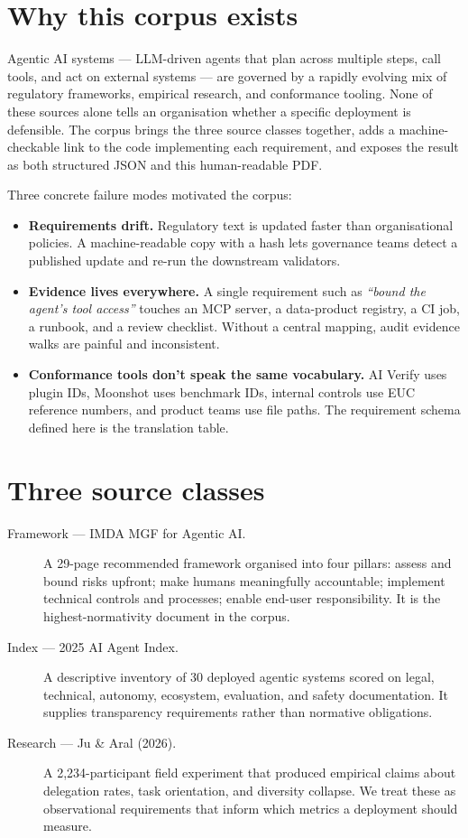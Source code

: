 \documentclass[11pt,a4paper,twoside]{report}
\newcommand{\corpus}{}
\begin{document}
\section{Why this corpus exists}

Agentic AI systems --- LLM-driven agents that plan across multiple steps,
call tools, and act on external systems --- are governed by a rapidly
evolving mix of regulatory frameworks, empirical research, and conformance
tooling. None of these sources alone tells an organisation whether a
specific deployment is defensible. The \corpus{} corpus brings the three
source classes together, adds a machine-checkable link to the code
implementing each requirement, and exposes the result as both structured
JSON and this human-readable PDF.

Three concrete failure modes motivated the corpus:

\begin{itemize}
\item \textbf{Requirements drift.} Regulatory text is updated faster than
organisational policies. A machine-readable copy with a hash lets
governance teams detect a published update and re-run the
downstream validators.
\item \textbf{Evidence lives everywhere.} A single requirement such as
\emph{``bound the agent's tool access''} touches an MCP server, a
data-product registry, a CI job, a runbook, and a review checklist.
Without a central mapping, audit evidence walks are painful and
inconsistent.
\item \textbf{Conformance tools don't speak the same vocabulary.} AI
Verify uses plugin IDs, Moonshot uses benchmark IDs, internal
controls use EUC reference numbers, and product teams use file
paths. The requirement schema defined here is the translation
table.
\end{itemize}

\section{Three source classes}

\begin{description}
\item[Framework --- IMDA MGF for Agentic AI.] A 29-page recommended
framework organised into four pillars: assess and bound risks upfront;
make humans meaningfully accountable; implement technical controls and
processes; enable end-user responsibility. It is the highest-normativity
document in the corpus.
\item[Index --- 2025 AI Agent Index.] A descriptive inventory of 30
deployed agentic systems scored on legal, technical, autonomy,
ecosystem, evaluation, and safety documentation. It supplies
transparency requirements rather than normative obligations.
\item[Research --- Ju \& Aral (2026).] A 2{,}234-participant field
experiment that produced empirical claims about delegation rates, task
orientation, and diversity collapse. We treat these as observational
requirements that inform which metrics a deployment should measure.
\end{description}
\end{document}

